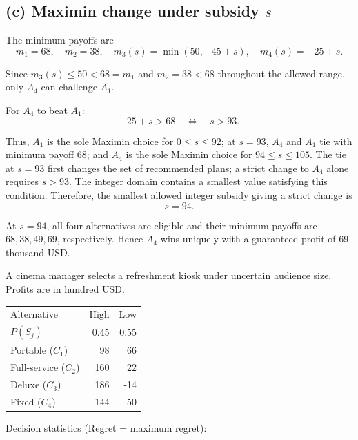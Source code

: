 \secInicio[sec:q1]

\label{sol:q1c}
\subsection*{(c) Maximin change under subsidy $s$ }

The minimum payoffs are
\[
m_1=68,\quad m_2=38,\quad
m_3(s)=\min(50,-45+s),\quad m_4(s)=-25+s.
\]

Since $m_3(s)\le50<68=m_1$ and $m_2=38<68$ throughout
the allowed range, only $A_4$ can challenge $A_1$.

For $A_4$ to beat $A_1$:
\[
-25+s>68
\quad\Longleftrightarrow\quad s>93.
\]

Thus, $A_1$ is the sole Maximin choice for $0\le s\le92$;
at $s=93$, $A_4$ and $A_1$ tie with minimum payoff 68;
and $A_4$ is the sole Maximin choice for $94\le s\le105$.
The tie at $s=93$ first changes the set of recommended plans;
a strict change to $A_4$ alone requires $s>93$.
The integer domain contains a smallest value satisfying this condition.
Therefore, the smallest allowed integer subsidy giving a strict change is
\[
\boxed{s=94}.
\]

At $s=94$, all four alternatives are eligible and their minimum
payoffs are $68,38,49,69$, respectively. Hence $A_4$ wins uniquely
with a guaranteed profit of 69 thousand USD.
\secInicio[sec:q1]



A cinema manager selects a refreshment kiosk under uncertain audience size. Profits are in hundred USD.

\begin{center}\small\setlength{\tabcolsep}{4pt}
	\begin{tabular}{lrr}\toprule
		Alternative & High & Low\\
		$P(S_j)$ & 0.45 & 0.55\\ \midrule
				Portable ($C_1$) & 98 & 66\\
		Full-service ($C_2$) & 160 & 22\\
		Deluxe ($C_3$) & 186 & -14\\
		Fixed ($C_4$) & 144 & 50\\
		\bottomrule
	\end{tabular}
\end{center} \vspace{-3mm}

Decision statistics (Regret = maximum regret):

